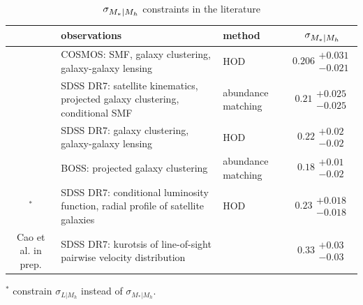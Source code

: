 \documentclass[12pt, letterpaper, preprint, tighten]{aastex62}
\newcommand{\siglogm}{\sigma_{\scaleto{M_*|M_h}{8pt}}}
\begin{document}
\begin{table}
    \caption{$\siglogm$ constraints in the literature} 
    \begin{center}
        \begin{tabular}{c p{6cm} p{3cm} c} \toprule
            & observations & method & $\siglogm$  \\[3pt] \hline\hline
            \cite{leauthaud2012}    &COSMOS: SMF, galaxy clustering, galaxy-galaxy lensing& HOD & $0.206\substack{+0.031\\-0.021}$\\\hline 
            \cite{reddick2013}      &SDSS DR7: satellite kinematics, projected galaxy clustering, conditional SMF & abundance matching & $0.21\substack{+0.025\\-0.025}$ \\\hline 
            \cite{zu2015}           &SDSS DR7: galaxy clustering, galaxy-galaxy lensing& HOD & $0.22\substack{+0.02\\-0.02}$ \\\hline 
            \cite{tinker2017}       &BOSS: projected galaxy clustering & abundance matching & $0.18\substack{+0.01\\-0.02}$ \\\hline
            \cite{lange2018a}$^{*}$ &SDSS DR7: conditional luminosity function, radial profile of satellite galaxies& HOD & $0.23\substack{+0.018\\-0.018}$ \\\hline
            Cao et al. in prep.     &SDSS DR7: kurotsis of line-of-sight pairwise velocity distribution & & $0.33\substack{+0.03\\-0.03}$ \\ [3pt]
    \hline
\end{tabular} \label{tab:lit}
\end{center}
    $^*$\cite{lange2018a} constrain $\sigma_{L|M_h}$ instead of $\sigma_{M_*|M_h}$. 
\end{table}
\end{document}
